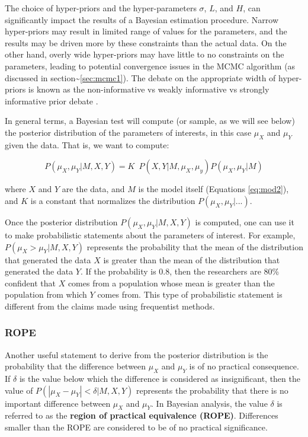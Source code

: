 \documentclass[twoside,11pt,preprint]{article}
\begin{document}
The choice of hyper-priors and the hyper-parameters \(\sigma\), \(L\), and \(H\), can significantly impact the results of a Bayesian estimation procedure. Narrow hyper-priors may result in limited range of values for the parameters, and the results may be driven more by these constraints than the actual data. On the other hand, overly wide hyper-priors may have little to no constraints on the parameters, leading to potential convergence issues in the MCMC algorithm (as discussed in section\textasciitilde{}\ref{sec:mcmc1}). The debate on the appropriate width of hyper-priors is known as the non-informative vs weakly informative vs strongly informative prior debate \citep{lemoine2019moving, gelman2017prior}.

In general terms, a Bayesian test will compute (or sample, as we will
see below) the posterior distribution of the parameters of interests,
in this case \(\mu_X\) and \(\mu_Y\) given the data. That is, we want to
compute:

\[ P(\mu_X,\mu_Y | M, X, Y) = K \; \:  P(X,Y| M, \mu_X, \mu_y) P(\mu_X, \mu_Y | M)\]

where \(X\) and \(Y\) are the data, and \(M\) is the model itself
(Equations \ref{eq:mod2}), and \(K\) is a constant that normalizes the
distribution \(P(\mu_X,\mu_Y| ...)\).

Once the posterior distribution \(P(\mu_X,\mu_Y | M, X, Y)\) is computed, one can use it to make probabilistic statements about the parameters of interest. For example, \(P(\mu_X > \mu_Y | M, X, Y)\) represents the probability that the mean of the distribution that generated the data \(X\) is greater than the mean of the distribution that generated the data \(Y\). If the probability is 0.8, then the researchers are 80\% confident that \(X\) comes from a population whose mean is greater than the population from which \(Y\) comes from. This type of probabilistic statement is different from the claims made using frequentist methods.

\hypertarget{rope}{%
\subsubsection{\texorpdfstring{ROPE \label{sec:rope}}{ROPE }}\label{rope}}

Another useful statement to derive from the posterior distribution is the probability that the difference between \(\mu_X\) and \(\mu_Y\) is of no practical consequence. If \(\delta\) is the value below which the difference is considered as insignificant, then the value of \(P(|\mu_X - \mu_Y| < \delta | M, X, Y)\) represents the probability that there is no important difference between \(\mu_X\) and \(\mu_Y\). In Bayesian analysis, the value \(\delta\) is referred to as the \textbf{region of practical equivalence (ROPE)}. Differences smaller than the ROPE are considered to be of no practical significance.
\end{document}

